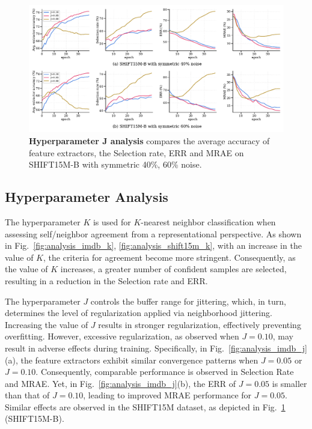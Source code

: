 \documentclass{article}
\theoremstyle{plain}
\theoremstyle{definition}
\theoremstyle{remark}
\begin{document}
\begin{figure}[th]
\begin{center}
\centerline{\includegraphics[width=\textwidth]{imgs/hp_analysis_shift15m_j.pdf}}
\vskip -0.2in
\caption{
    \textbf{Hyperparameter J analysis} compares the average accuracy of feature extractors, the Selection rate, ERR and MRAE on SHIFT15M-B with symmetric 40\%, 60\% noise.}
\label{fig:analysis_shift15m_j}
\end{center}
\end{figure}

\subsection{Hyperparameter Analysis}\label{subsec:hyperparameter}
The hyperparameter $K$ is used for $K$-nearest neighbor classification when assessing self/neighbor agreement from a representational perspective.
As shown in Fig.~\ref{fig:analysis_imdb_k}, \ref{fig:analysis_shift15m_k}, with an increase in the value of $K$, the criteria for agreement become more stringent.
Consequently, as the value of $K$ increases, a greater number of confident samples are selected, resulting in a reduction in the Selection rate and ERR. 

The hyperparameter $J$ controls the buffer range for jittering, which, in turn, determines the level of regularization applied via neighborhood jittering.
Increasing the value of $J$ results in stronger regularization, effectively preventing overfitting. 
However, excessive regularization, as observed when $J = 0.10$, may result in adverse effects during training.
Specifically, in Fig.~\ref{fig:analysis_imdb_j}(a), the feature extractors exhibit similar convergence patterns when $J = 0.05$ or $J = 0.10$. 
Consequently, comparable performance is observed in Selection Rate and MRAE.
Yet, in Fig.~\ref{fig:analysis_imdb_j}(b), the ERR of $J = 0.05$ is smaller than that of $J = 0.10$, leading to improved MRAE performance for $J=0.05$. 
Similar effects are observed in the SHIFT15M dataset, as depicted in Fig.~\ref{fig:analysis_shift15m_j} (SHIFT15M-B).
\end{document}
